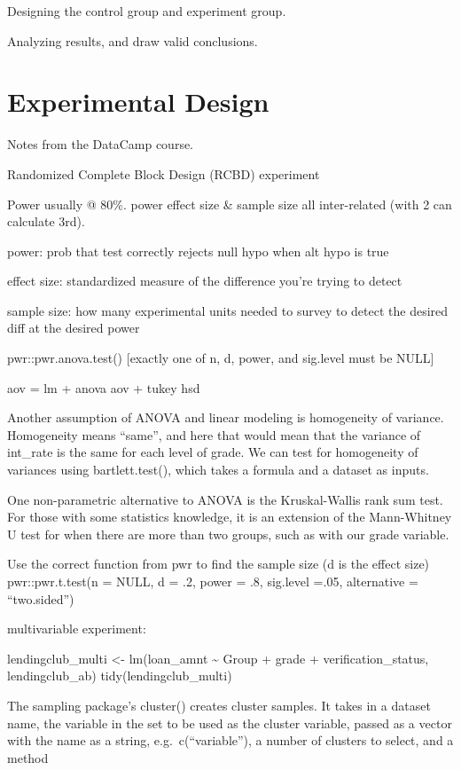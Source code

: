 \documentclass[]{book}
\begin{document}
Designing the control group and experiment group.

Analyzing results, and draw valid conclusions.

\section{Experimental Design}\label{experimental-design}

Notes from the DataCamp course.

Randomized Complete Block Design (RCBD) experiment

Power usually @ 80\%. power effect size \& sample size all inter-related
(with 2 can calculate 3rd).

power: prob that test correctly rejects null hypo when alt hypo is true

effect size: standardized measure of the difference you're trying to
detect

sample size: how many experimental units needed to survey to detect the
desired diff at the desired power

pwr::pwr.anova.test() {[}exactly one of n, d, power, and sig.level must
be NULL{]}

aov = lm + anova aov + tukey hsd

Another assumption of ANOVA and linear modeling is homogeneity of
variance. Homogeneity means ``same'', and here that would mean that the
variance of int\_rate is the same for each level of grade. We can test
for homogeneity of variances using bartlett.test(), which takes a
formula and a dataset as inputs.

One non-parametric alternative to ANOVA is the Kruskal-Wallis rank sum
test. For those with some statistics knowledge, it is an extension of
the Mann-Whitney U test for when there are more than two groups, such as
with our grade variable.

Use the correct function from pwr to find the sample size (d is the
effect size) pwr::pwr.t.test(n = NULL, d = .2, power = .8, sig.level
=.05, alternative = ``two.sided'')

multivariable experiment:

lendingclub\_multi \textless{}- lm(loan\_amnt \textasciitilde{} Group +
grade + verification\_status, lendingclub\_ab) tidy(lendingclub\_multi)

The sampling package's cluster() creates cluster samples. It takes in a
dataset name, the variable in the set to be used as the cluster
variable, passed as a vector with the name as a string,
e.g.~c(``variable''), a number of clusters to select, and a method
\end{document}
